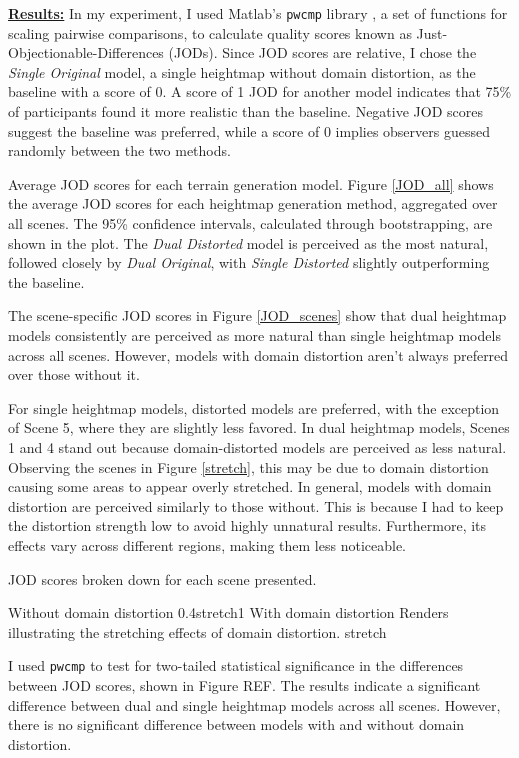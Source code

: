 \textbf{\underline{Results:}} In my experiment, I used Matlab's \texttt{pwcmp} library \cite{perez-ortiz_practical_2017}, a set of functions for scaling pairwise comparisons, to calculate quality scores known as Just-Objectionable-Differences (JODs). Since JOD scores are relative, I chose the \textit{Single Original} model, a single heightmap without domain distortion, as the baseline with a score of 0. A score of 1 JOD for another model indicates that 75\% of participants found it more realistic than the baseline. Negative JOD scores suggest the baseline was preferred, while a score of 0 implies observers guessed randomly between the two methods.

{Average JOD scores for each terrain generation model.}{
Figure \ref{JOD_all} shows the average JOD scores for each heightmap generation method, aggregated over all scenes. The 95\% confidence intervals, calculated through bootstrapping, are shown in the plot. The \textit{Dual Distorted} model is perceived as the most natural, followed closely by \textit{Dual Original}, with \textit{Single Distorted} slightly outperforming the baseline.
}


The scene-specific JOD scores in Figure \ref{JOD_scenes} show that dual heightmap models consistently are perceived as more natural than single heightmap models across all scenes. However, models with domain distortion aren't always preferred over those without it. 

For single heightmap models, distorted models are preferred, with the exception of Scene 5, where they are slightly less favored. In dual heightmap models, Scenes 1 and 4 stand out because domain-distorted models are perceived as less natural. Observing the scenes in Figure \ref{stretch}, this may be due to domain distortion causing some areas to appear overly stretched. In general, models with domain distortion are perceived similarly to those without. This is because I had to keep the distortion strength low to avoid highly unnatural results. Furthermore, its effects vary across different regions, making them less noticeable.

{JOD scores broken down for each scene presented.}

{Without domain distortion}
{0.4}{stretch1}
{With domain distortion}
{Renders illustrating the stretching effects of domain distortion.}
{stretch}

I used \texttt{pwcmp} to test for two-tailed statistical significance in the differences between JOD scores, shown in Figure REF. The results indicate a significant difference between dual and single heightmap models across all scenes. However, there is no significant difference between models with and without domain distortion.

